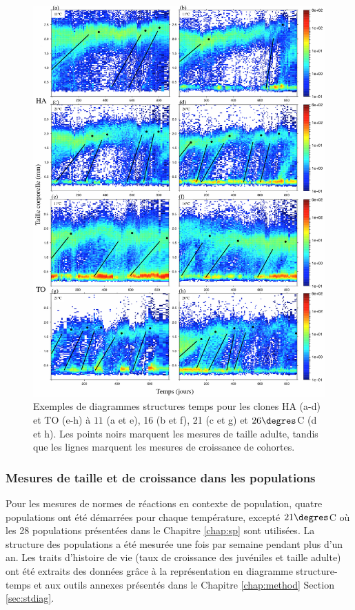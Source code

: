 \begin{figure}[H]
\begin{center}
\includegraphics[width=\textwidth]{1_CorpsDeThese/Resumes/Fig/FIP02}
\caption[Exemples de diagrammes
structures temps]{Exemples de diagrammes
structures temps pour les clones HA
(a-d) et TO (e-h) à $11$ (a et e), 16 (b et f), 21 (c et g) et $26\degres$C
(d et h). Les points noirs marquent les mesures de taille
adulte, tandis que les lignes marquent les mesures de
croissance de cohortes.}
\label{fig:FIP2}
\end{center}
\end{figure}

\subsubsection{Mesures de taille et de croissance dans les populations}

Pour les mesures de normes de réactions en contexte de population, quatre
populations ont été démarrées pour chaque température, excepté $21\degres$C où
les 28 populations présentées dans le Chapitre \ref{chap:sp} sont utilisées. La
structure des populations a été mesurée une fois par semaine pendant plus d'un
an. Les traits d'histoire de vie (taux de croissance des juvéniles et taille
adulte) ont été extraits des données grâce à la représentation en diagramme
structure-temps et aux outils annexes présentés dans le Chapitre
\ref{chap:method} Section \ref{sec:stdiag}. 

